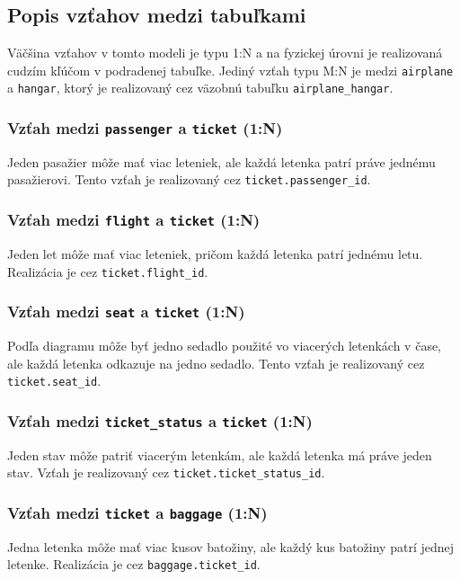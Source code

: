 \documentclass[11pt, a4paper]{article}
\begin{document}
\subsection{Popis vzťahov medzi tabuľkami}

Väčšina vzťahov v tomto modeli je typu 1:N a na fyzickej úrovni je
realizovaná cudzím kľúčom v podradenej tabuľke. Jediný vzťah typu M:N je
medzi \texttt{airplane} a \texttt{hangar}, ktorý je realizovaný cez väzobnú
tabuľku \texttt{airplane\_hangar}.

\subsubsection*{Vzťah medzi \texttt{passenger} a \texttt{ticket} (1:N)}
Jeden pasažier môže mať viac leteniek, ale každá letenka patrí práve jednému
pasažierovi. Tento vzťah je realizovaný cez \texttt{ticket.passenger\_id}.

\subsubsection*{Vzťah medzi \texttt{flight} a \texttt{ticket} (1:N)}
Jeden let môže mať viac leteniek, pričom každá letenka patrí jednému letu.
Realizácia je cez \texttt{ticket.flight\_id}.

\subsubsection*{Vzťah medzi \texttt{seat} a \texttt{ticket} (1:N)}
Podľa diagramu môže byť jedno sedadlo použité vo viacerých letenkách v čase,
ale každá letenka odkazuje na jedno sedadlo. Tento vzťah je realizovaný cez
\texttt{ticket.seat\_id}.

\subsubsection*{Vzťah medzi \texttt{ticket\_status} a \texttt{ticket} (1:N)}
Jeden stav môže patriť viacerým letenkám, ale každá letenka má práve jeden
stav. Vzťah je realizovaný cez \texttt{ticket.ticket\_status\_id}.

\subsubsection*{Vzťah medzi \texttt{ticket} a \texttt{baggage} (1:N)}
Jedna letenka môže mať viac kusov batožiny, ale každý kus batožiny patrí jednej
letenke. Realizácia je cez \texttt{baggage.ticket\_id}.
\end{document}
